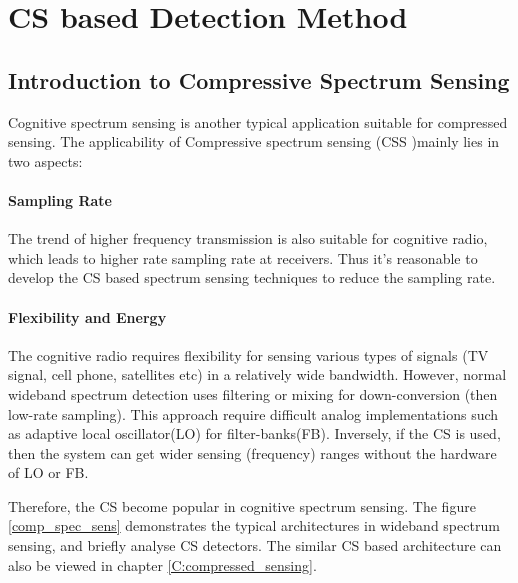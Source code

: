 \section{CS based Detection Method}\label{sct:cwd}

\subsection{Introduction to Compressive Spectrum Sensing }\label{sct:css}

Cognitive spectrum sensing is another typical application suitable for compressed sensing. The applicability of Compressive spectrum sensing (CSS )mainly lies in two aspects:  

\paragraph{Sampling Rate}
The trend of higher frequency transmission is also suitable for cognitive radio, which leads to higher rate sampling rate at receivers. Thus it's reasonable to develop the CS based spectrum sensing techniques to reduce the sampling rate.

\paragraph{Flexibility and Energy}
The cognitive radio requires flexibility for sensing various  types of signals (TV signal, cell phone, satellites etc) in a relatively wide bandwidth. However, normal wideband spectrum detection uses filtering or mixing for down-conversion (then low-rate sampling). This approach require difficult analog implementations such as adaptive local oscillator(LO) for filter-banks(FB). Inversely, if the CS is used, then the system can get wider sensing (frequency) ranges without the hardware of LO or FB.

Therefore, the CS become popular in cognitive spectrum sensing. The figure \ref{comp_spec_sens} demonstrates the typical architectures in wideband spectrum sensing, and briefly analyse CS detectors. The similar CS based architecture can also be viewed in chapter \ref{C:compressed_sensing}.

